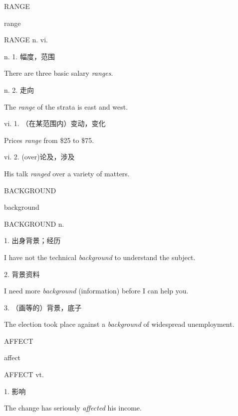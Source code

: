 \begin{flashcard}{
RANGE

range
}
\begin{center}
RANGE n. vi. 
\end{center}
n. 1. 幅度，范围

There are three basic salary \textit{ranges}.

n. 2. 走向

The \textit{range} of the strata is east and west.

vi. 1. （在某范围内）变动，变化

Prices \textit{range} from \$25 to \$75.

vi. 2. (over)论及，涉及

His talk \textit{ranged} over a variety of matters.

\end{flashcard}
\begin{flashcard}{
BACKGROUND

background
}
\begin{center}
BACKGROUND n. 
\end{center}
1. 出身背景；经历

I have not the technical \textit{background} to understand the subject.

2. 背景资料

I need more \textit{background} (information) before I can help you.

3. （画等的）背景，底子

The election took place against a \textit{background} of widespread unemployment.

\end{flashcard}
\begin{flashcard}{
AFFECT

affect
}
\begin{center}
AFFECT vt. 
\end{center}
1. 影响

The change has seriously \textit{affected} his income.

\end{flashcard}
